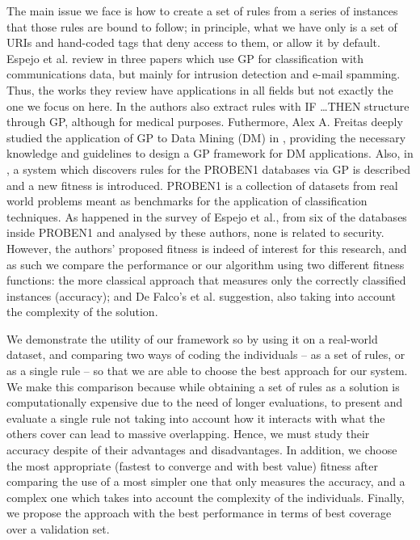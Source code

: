 \documentclass[runningheads]{llncs}
\begin{document}
The main issue we face is how to create a set of rules from a series
of instances that those rules are bound to follow; in principle, what
we have only is a set of URIs and hand-coded tags that deny access to
them, or allow it by default.  Espejo et al. review in
\cite{espejo2010survey} three papers which use GP for classification
with communications data, but mainly for intrusion detection and
e-mail spamming. Thus, the works they review have applications in all
fields but not exactly the one we focus on here. In
\cite{Tsakonas2004195} the authors also extract rules with \textsc{IF
\ldots THEN} structure through GP, although for medical
purposes. Futhermore, Alex A. Freitas deeply studied the application
of GP to Data Mining (DM) in \cite{freitas2002data}, providing the
necessary knowledge and guidelines to design a GP framework for DM
applications. Also, in \cite{DeFalco2002257}, a system which discovers
rules for the PROBEN1 databases via GP is described and a new fitness
is introduced. PROBEN1 \cite{prechelt1994proben} is a collection of
datasets from real world problems meant as benchmarks for the
application of classification techniques. As happened in the survey of
Espejo et al., from six of the databases inside PROBEN1 and analysed
by these authors, none is related to security. However, the authors'
proposed fitness is indeed of interest for this research, and as such
we compare the performance or our algorithm using two different
fitness functions: the more classical approach that measures only the
correctly classified instances (accuracy); and De Falco's et
al. \cite{DeFalco2002257} suggestion, also taking into account the
complexity of the solution.


We demonstrate the utility of our framework so by using it on a
real-world dataset, and comparing two 
ways of coding the individuals -- as a set of rules, or as a single
rule -- so that we are able to choose the best approach for our
system. We make this comparison because while obtaining a set of rules
as a solution is computationally expensive due to the need of longer
evaluations, to present and evaluate a single rule not taking into
account how it interacts with what the others cover
\cite{freitas2002data} can lead to massive overlapping. Hence, we must
study their accuracy despite of their advantages and disadvantages. In
addition, we choose the most appropriate (fastest to converge and with
best value) fitness after comparing the use of a most simpler one that
only measures the accuracy, and a complex one which takes into account
the complexity of the individuals. Finally, we propose the approach
with the best performance in terms of best coverage over a validation
set.
\end{document}
